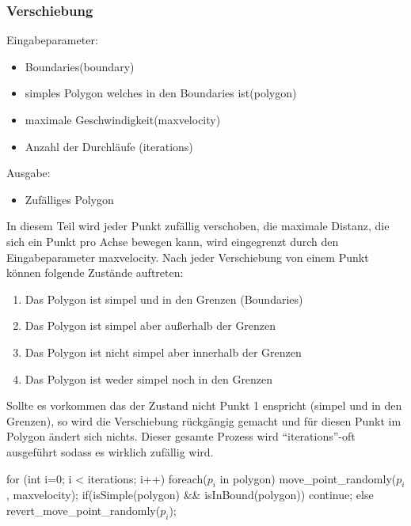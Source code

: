   \subsubsection{Verschiebung}
    Eingabeparameter: 
    \begin{itemize}
      \item Boundaries(boundary)
      \item simples Polygon welches in den Boundaries ist(polygon)
      \item maximale Geschwindigkeit(maxvelocity)
      \item Anzahl der Durchläufe (iterations)
    \end{itemize}
    Ausgabe:
    \begin{itemize}
      \item Zufälliges Polygon
    \end{itemize}
    In diesem Teil wird jeder Punkt zufällig verschoben, die maximale 
    Distanz, die sich ein Punkt pro Achse bewegen kann, wird eingegrenzt 
    durch den Eingabeparameter maxvelocity. Nach jeder Verschiebung von 
    einem Punkt können folgende Zustände auftreten:
    \begin{enumerate}
      \item Das Polygon ist simpel und in den Grenzen (Boundaries)
      \item Das Polygon ist simpel aber außerhalb der Grenzen
      \item Das Polygon ist nicht simpel aber innerhalb der Grenzen
      \item Das Polygon ist weder simpel noch in den Grenzen
    \end{enumerate}
    Sollte es vorkommen das der Zustand nicht Punkt 1 enspricht (simpel 
    und in den Grenzen), so wird die Verschiebung rückgängig gemacht und 
    für diesen Punkt im Polygon ändert sich nichts.
    Dieser gesamte Prozess wird \enquote{iterations}-oft ausgeführt sodass 
    es wirklich zufällig wird.

    \begin{code}[caption={Pseudocode},mathescape=true]
    for (int i=0; i < iterations; i++)
    {
      foreach($p_i$ in polygon)
      {
        move_point_randomly($p_i$, maxvelocity);
        if(isSimple(polygon) && isInBound(polygon))
          continue;
        else
          revert_move_point_randomly($p_i$);
      }
    }
    \end{code}

